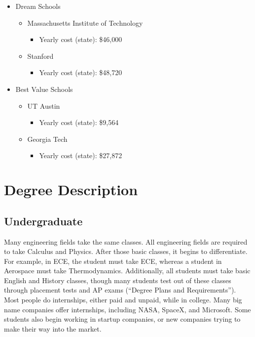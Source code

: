 \begin{itemize}
    \begin{itemize}
        \item{Dream Schools}
            \begin{itemize}
                \item{Massachusetts Institute of Technology}
                    \begin{itemize}
                        \item{Yearly cost (state):} \$46,000
                    \end{itemize}
                \item{Stanford}
                    \begin{itemize}
                        \item{Yearly cost (state):} \$48,720
                    \end{itemize}
            \end{itemize}
        \item{Best Value Schools} 
            \begin{itemize}
                \item{UT Austin}
                    \begin{itemize}
                        \item{Yearly cost (state):} \$9,564 
                    \end{itemize}
                \item{Georgia Tech}
                    \begin{itemize}
                        \item{Yearly cost (state):} \$27,872
                    \end{itemize}
            \end{itemize}
    \end{itemize}
\end{itemize}

\section{Degree Description}
    \subsection{Undergraduate}
        Many engineering fields take the same classes. All engineering fields are required to take Calculus and Physics. After those basic classes, it begins to differentiate. For example, in ECE, the student must take ECE, whereas a student in Aerospace must take Thermodynamics. Additionally, all students must take basic English and History classes, though many students test out of these classes through placement tests and AP exams (“Degree Plans and Requirements”). 
        Most people do internships, either paid and unpaid, while in college. Many big name companies offer internships, including NASA, SpaceX, and Microsoft. Some students also begin working in startup companies, or new companies trying to make their way into the market. 
